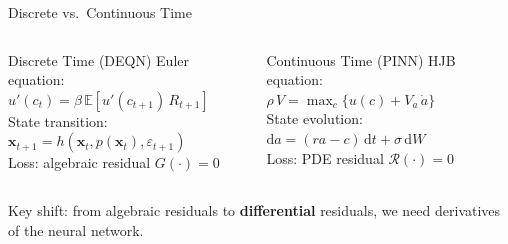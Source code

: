 \documentclass[aspectratio=169,11pt]{beamer}
\newcommand{\emphc}[1]{\textcolor{harvardcrimson}{#1}}
\newcommand{\x}{\bm{x}}
\newcommand{\E}[1]{\mathbb{E}\!\left[#1\right]}
\begin{document}
\begin{frame}{Discrete vs.\ Continuous Time}
\begin{columns}[T]
\begin{block}{Discrete Time (DEQN)}
\centering\small
\vspace{0.2em}
Euler equation:\\[4pt]
$u'(c_t) = \beta\,\E{u'(c_{t+1})\,R_{t+1}}$\\[8pt]
State transition:\\[4pt]
$\x_{t+1} = h(\x_t, p(\x_t), \varepsilon_{t+1})$\\[8pt]
Loss: algebraic residual $G(\cdot) = 0$
\vspace{0.2em}
\end{block}

\begin{exampleblock}{Continuous Time (PINN)}
\centering\small
\vspace{0.2em}
HJB equation:\\[4pt]
$\rho\, V = \max_c \bigl\{u(c) + V_a\,\dot{a}\bigr\}$\\[8pt]
State evolution:\\[4pt]
$\mathrm{d}a = (ra - c)\,\mathrm{d}t + \sigma\,\mathrm{d}W$\\[8pt]
Loss: PDE residual $\mathcal{R}(\cdot) = 0$
\vspace{0.2em}
\end{exampleblock}
\end{columns}

\vspace{0.6em}
\begin{center}
{\small \emphc{Key shift:} from algebraic residuals to \textbf{differential} residuals, we need \emphc{derivatives} of the neural network.}
\end{center}
\end{frame}
\end{document}
